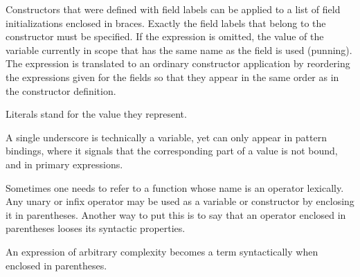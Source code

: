 Constructors that were defined with field labels can be applied to a list of field initializations enclosed in braces. 
Exactly the field labels that belong to the constructor must be specified. 
If the expression is omitted, the value of the variable currently in scope that has the same name as the field is used (punning). 
The expression is translated to an ordinary constructor application by reordering the expressions given for the fields so that they appear in the same order as in the constructor definition.



Literals stand for the value they represent.

A single underscore is technically a variable, yet can only appear in pattern bindings, where it signals that the corresponding part of a value is not bound, and in primary expressions.

Sometimes one needs to refer to a function whose name is an operator lexically. Any unary or infix operator may be used as a variable or constructor by enclosing it in parentheses.
Another way to put this is to say that an operator enclosed in parentheses looses its syntactic properties.


An expression of arbitrary complexity becomes a term syntactically when enclosed in parentheses.

